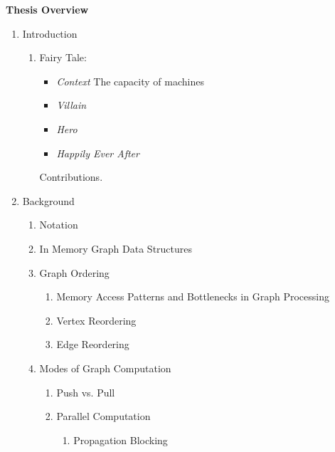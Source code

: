 
\textbf{Thesis Overview}

\begin{enumerate}
    \item{Introduction
    \begin{enumerate}[label*=\arabic*.]
        \item Fairy Tale: 
        \begin{itemize}
            \item \textit{Context}
            The capacity of machines
            \item \textit{Villain}
            \item \textit{Hero}
            \item \textit{Happily Ever After}
        \end{itemize}
        Contributions.
    \end{enumerate}
    }

    \item{Background}
    \begin{enumerate}[label*=\arabic*.]
        \item Notation
        \item In Memory Graph Data Structures
        \item{Graph Ordering}
        \begin{enumerate}[label*=\arabic*.]
            \item Memory Access Patterns and Bottlenecks in Graph Processing
            \item Vertex Reordering
            \item Edge Reordering
        \end{enumerate}
        \item{Modes of Graph Computation}
        \begin{enumerate}[label*=\arabic*.]
            \item Push vs. Pull
            \item Parallel Computation
            \begin{enumerate}[label*=\arabic*.]
                \item Propagation Blocking
            \end{enumerate}
        \end{enumerate}
    \end{enumerate}


\end{enumerate}

